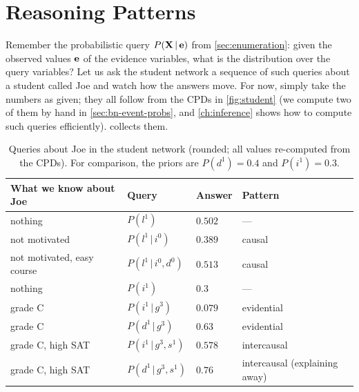 \documentclass[11pt, oneside]{book}
\newcommand{\Prob}{\mathbb{P}}           %
\newcommand{\given}{\,\vert\,}           %
\newcommand{\bX}{\mathbf{X}}  \newcommand{\bY}{\mathbf{Y}}
\let\originalsection\section
\renewcommand{\section}{\Needspace{7\baselineskip}\originalsection}
\begin{document}
\section{Reasoning Patterns}
\label{sec:reasoning-patterns}

Remember the probabilistic query $P(\bX \given \be)$ from
\cref{sec:enumeration}: given the observed values $\mathbf{e}$ of the evidence
variables, what is the distribution over the query variables? Let us ask the
student network a sequence of such queries about a student called Joe and
watch how the answers move. For now, simply take the numbers as given; they
all follow from the CPDs in \cref{fig:student} (we compute two of them by hand
in \cref{sec:bn-event-probs}, and \cref{ch:inference} shows how to compute
such queries efficiently).  collects them.

\begin{table}[htbp]
\centering
\small
\begin{tabular}{@{}llll@{}}
\toprule
\textbf{What we know about Joe} & \textbf{Query} & \textbf{Answer} & \textbf{Pattern} \\
\midrule
nothing                         & $P(l^1)$                   & $0.502$ & --- \\
not motivated                   & $P(l^1 \given i^0)$        & $0.389$ & causal \\
not motivated, easy course      & $P(l^1 \given i^0, d^0)$   & $0.513$ & causal \\
\midrule
nothing                         & $P(i^1)$                   & $0.3$   & --- \\
grade C                         & $P(i^1 \given g^3)$        & $0.079$ & evidential \\
grade C                         & $P(d^1 \given g^3)$        & $0.63$  & evidential \\
\midrule
grade C, high SAT               & $P(i^1 \given g^3, s^1)$   & $0.578$ & intercausal \\
grade C, high SAT               & $P(d^1 \given g^3, s^1)$   & $0.76$  & intercausal (explaining away) \\
\bottomrule
\end{tabular}
\caption{Queries about Joe in the student network (rounded; all values
re-computed from the CPDs). For comparison, the priors are $P(d^1) = 0.4$ and
$P(i^1) = 0.3$.}
\label{tab:joe}
\end{table}
\end{document}
